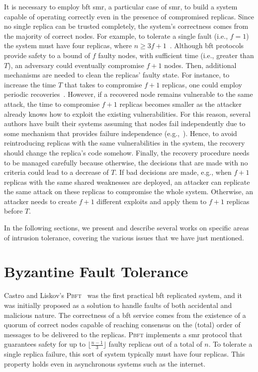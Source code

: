 It is necessary to employ \gls{bft} \gls{smr}, a particular case of \gls{smr}, to build a system capable of operating correctly even in the presence of compromised replicas.
Since no single replica can be trusted completely, the system's correctness comes from the majority of correct nodes.
For example, to tolerate a single fault (i.e., $f=1$) the system must have four replicas, where $n \geq 3f+1$~\cite{Castro:2002}.
Although \gls{bft} protocols provide safety to a bound of $f$ faulty nodes, with sufficient time (i.e., greater than $T$), an adversary could eventually compromise $f+1$ nodes.
Then, additional mechanisms are needed to clean the replicas' faulty state.
For instance, to increase the time $T$ that takes to compromise $f+1$ replicas, one could employ periodic recoveries~\cite{Castro:2002,Sousa:2010,Roeder:2010,Platania:2014,Distler:2011}. 
However, if a recovered node remains vulnerable to the same attack, the time to compromise $f+1$ replicas becomes smaller as the attacker already knows how to exploit the existing vulnerabilities.
For this reason, several authors have built their systems assuming that nodes fail independently due to some mechanism that provides failure independence (e.g.,~\cite{Castro:2002,Bessani:2008,Veronese:2013,Sousa:2010}).
Hence, to avoid reintroducing replicas with the same vulnerabilities in the system, the recovery should change the replica's code somehow.
Finally, the recovery procedure needs to be managed carefully because otherwise, the decisions that are made with no criteria could lead to a decrease of $T$.
If bad decisions are made, e.g., when $f+1$ replicas with the same shared weaknesses are deployed, an attacker can replicate the same attack on these replicas to compromise the whole system.
Otherwise, an attacker needs to create $f+1$ different exploits and apply them to $f+1$ replicas before $T$. 


In the following sections, we present and describe several works on specific areas of intrusion tolerance, covering the various issues that we have just mentioned.


\section{Byzantine Fault Tolerance}

Castro and Liskov’s \textsc{Pbft}~\cite{Castro:1999} was the first practical \gls{bft} replicated system, and it was initially proposed as a solution to handle faults of both accidental and malicious nature.
The correctness of a \gls{bft} service comes from the existence of a quorum of correct nodes capable of reaching consensus on the (total) order of messages to be delivered to the replicas.
\textsc{Pbft} implements a \gls{smr} protocol that guarantees safety for up to $\lfloor\frac{n-1}{3}\rfloor$ faulty replicas out of a total of $n$. 
To tolerate a single replica failure, this sort of system typically must have four replicas. 
This property holds even in asynchronous systems such as the internet. 

